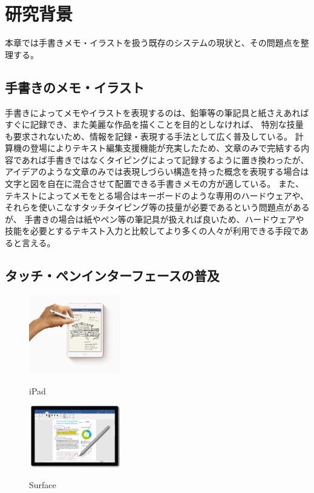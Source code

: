 \chapter{研究背景}
\label{chap:haikei}

本章では手書きメモ・イラストを扱う既存のシステムの現状と、その問題点を整理する。

\newpage

\section{手書きのメモ・イラスト}
手書きによってメモやイラストを表現するのは、鉛筆等の筆記具と紙さえあればすぐに記録でき、また美麗な作品を描くことを目的としなければ、
特別な技量も要求されないため、情報を記録・表現する手法として広く普及している。
計算機の登場によりテキスト編集支援機能が充実したため、文章のみで完結する内容であれば手書きではなくタイピングによって記録するように置き換わったが、
アイデアのような文章のみでは表現しづらい構造を持った概念を表現する場合は文字と図を自在に混合させて配置できる手書きメモの方が適している。
また、テキストによってメモをとる場合はキーボードのような専用のハードウェアや、それらを使いこなすタッチタイピング等の技量が必要であるという問題点があるが、
手書きの場合は紙やペン等の筆記具が扱えれば良いため、ハードウェアや技能を必要とするテキスト入力と比較してより多くの人々が利用できる手段であると言える。

\section{タッチ・ペンインターフェースの普及}

\begin{figure}[htbp] \begin{minipage}{0.5\hsize}
                         \begin{center} {\includegraphics[width=40mm]{images/ipadmini.jpg}}
                         \end{center} \caption{iPad}
\end{minipage} \begin{minipage}{0.5\hsize}
                   \begin{center} {\includegraphics[width=40mm]{images/surface.jpg}}
                   \end{center} \caption{Surface}
\end{minipage}
\end{figure}

